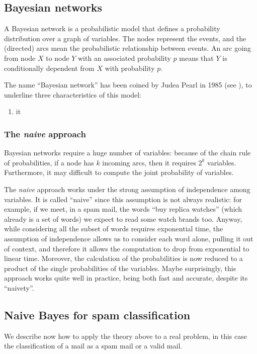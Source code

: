 \subsection{Bayesian networks}
A Bayesian network is a probabilistic model that defines a probability distribution over a graph of variables. The nodes represent the events, and the (directed) arcs mean the probabilistic relationship between events. An arc going from node $X$ to node $Y$ with an associated probability $p$ means that $Y$ is conditionally dependent from $X$ with probability $p$.

The name ``Bayesian network'' has been coined by Judea Pearl in 1985 (see \citeauthor{pearl1985bayesian}), to underline three characteristics of this model:

\begin{enumerate}[noitemsep]
  \item it 
\end{enumerate}

\subsubsection{The \textit{naive} approach}
Bayesian networks require a huge number of variables: because of the chain rule of probabilities, if a node has $k$ incoming arcs, then it requires $2^k$ variables. Furthermore, it may difficult to compute the joint probability of variables.

The \textit{naive} approach works under the strong assumption of independence among variables. It is called ``naive'' since this assumption is not always realistic: for example, if we meet, in a spam mail, the words ``buy replica watches'' (which already is a set of words) we expect to read some watch brands too. Anyway, while considering all the subset of words requires exponential time, the assumption of independence allows us to consider each word alone, pulling it out of context, and therefore it allows the computation to drop from exponential to linear time. Moreover, the calculation of the probabilities is now reduced to a product of the single probabilities of the variables. Maybe surprisingly, this approach works quite well in practice, being both fast and accurate, despite its ``naivety''.

\subsection{Naive Bayes for spam classification}
We describe now how to apply the theory above to a real problem, in this case the classification of a mail as a spam mail or a valid mail.

